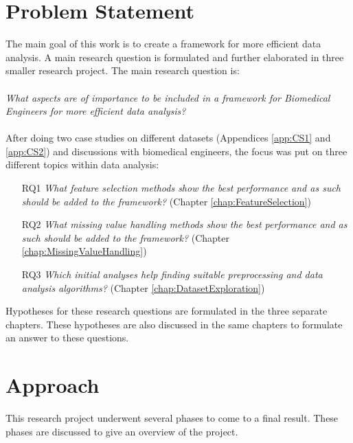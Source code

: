 \documentclass[10pt,a4paper]{report}
\begin{document}
	\section{Problem Statement}
	\label{IDsec:ProblemStatement}
	
	The main goal of this work is to create a framework for more efficient data analysis. A main research question is formulated and further elaborated in three smaller research project. The main research question is:\\
	\\
	\emph{What aspects are of importance to be included in a framework for Biomedical Engineers for more efficient data analysis?}\\
	\\
	
	After doing two case studies on different datasets (Appendices \ref{app:CS1} and \ref{app:CS2}) and discussions with biomedical engineers, the focus was put on three different topics within data analysis:
	
	\begin{itemize}
		\item[RQ1] \emph{What feature selection methods show the best performance and as such should be added to the framework?} (Chapter \ref{chap:FeatureSelection}) \\
		
		\item[RQ2] \emph{What missing value handling methods show the best performance and as such should be added to the framework?} (Chapter \ref{chap:MissingValueHandling}) \\
		
		\item[RQ3] \emph{Which initial analyses help finding suitable preprocessing and data analysis algorithms?} (Chapter \ref{chap:DatasetExploration}) \\
	\end{itemize}
	
	Hypotheses for these research questions are formulated in the three separate chapters. These hypotheses are also discussed in the same chapters to formulate an answer to these questions.
	
	\section{Approach}
	\label{sec:Approach}
	
	This research project underwent several phases to come to a final result. These phases are discussed to give an overview of the project.
	
\end{document}

